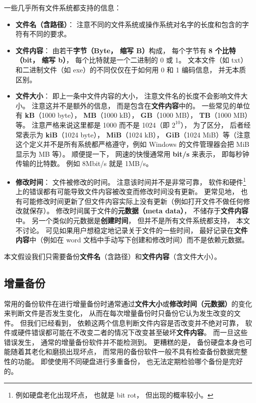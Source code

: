 一些几乎所有文件系统都支持的信息：
\begin{itemize}
\item \textbf{文件名（含路径）}： 注意不同的文件系统或操作系统对名字的长度和包含的字符有不同的要求。
\item \textbf{文件内容}： 由若干\textbf{字节（Byte， 缩写 B）}构成， 每个字节有 \textbf{8 个比特（bit， 缩写 b）}， 每个比特就是一个二进制的 0 或 1。 文本文件（如 txt）和二进制文件（如 exe）的不同仅仅在于如何用 0 和 1 编码信息， 并无本质区别。
\item \textbf{文件大小}： 即上一条中文件内容的大小， 注意文件名的长度不会影响文件大小。 注意这并不是额外的信息， 而是包含在\textbf{文件内容}中的。 一些常见的单位有 \textbf{kB}（1000 byte）， \textbf{MB}（1000 kB）， \textbf{GB}（1000 MB）， \textbf{TB}（1000 MB）等。 注意严格来说这里都是 1000 而不是 1024（即 $2^{10}$）， 为了区分， 后者经常表示为 \textbf{kiB}（1024 byte）， \textbf{MiB}（1024 kB）， \textbf{GiB}（1024 MiB）等（注意这个定义并不是所有系统都严格遵守，例如 Windows 的文件管理器会把 MiB 显示为 MB 等）。 顺便提一下， 网速的快慢通常用 \textbf{bit/s} 来表示， 即每秒钟传输的比特数。 例如 8Mbit/s 就是 1MB/s。
\item \textbf{修改时间}： 文件被修改的时间。 注意该时间并不是非常可靠， 软件和硬件\footnote{例如硬盘老化出现坏点， 也就是 bit rot， 但出现的概率较小。}上的错误都有可能导致文件内容被改变而修改时间没有更新。 更常见地， 也有可能修改时间更新了但文件内容实际上没有更新（例如打开文件不做任何修改就保存）。 修改时间属于文件的\textbf{元数据（meta data）}， 不储存于\textbf{文件内容}中。 另一个类似的元数据是\textbf{创建时间}， 但并不是所有文件系统都支持， 本文不讨论。 可见如果用户想稳定地记录关于文件的一些时间， 最好记录在\textbf{文件内容}中（例如在 word 文档中手动写下创建和修改时间）而不是依赖元数据。
\end{itemize}

本文假设我们只需要备份\textbf{文件名}（含路径）和\textbf{文件内容}（含文件大小）。

\subsection{增量备份}
常用的备份软件在进行增量备份时通常通过\textbf{文件大小}或\textbf{修改时间（元数据）}的变化来判断文件是否发生变化， 从而在每次增量备份时只备份它认为发生改变的文件。 但我们已经看到， 依赖这两个信息判断文件内容是否改变并不绝对可靠， 软件或硬件错误都可能在不改变二者的情况下改变甚至破坏\textbf{文件内容}。 而一旦这些错误发生， 通常的增量备份软件并不能检测到。 更糟糕的是， 备份硬盘本身也可能随着其老化和磨损出现坏点， 而常用的备份软件一般不具有检查备份数据完整性的功能。 即使使用不同硬盘进行多重备份， 也无法定期检验哪个备份是完好的。

